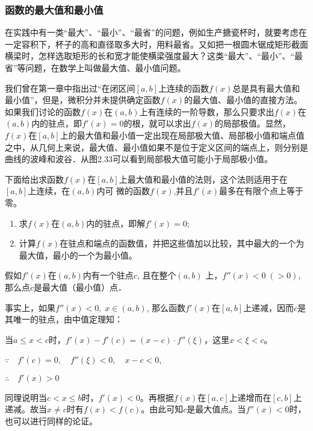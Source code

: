 \subsubsection{函数的最大值和最小值}
在实践中有一类“最大”、“最小”、“最省”的问题，例如生产搪瓷杯时，就要考虑在一定容积下，杯子的高和直径取多大时，用料最省。又如把一根圆木锯成矩形截面横梁时，怎样选取矩形的长和宽才能使横梁强度最大？这类“最大”、“最小”、“最省”等问题，在数学上叫做最大值、最小值问题。

我们曾在第一章中指出过“在闭区间$[a,b]$上连续的函数$f(x)$总是具有最大值和最小值”，但是，微积分并未提供确定函数$f(x)$的最大值、最小值的直接方法。如果我们讨论的函数$f(x)$在$(a,b)$上有连续的一阶导数，那么只要求出$f(x)$在$(a,b)$内的驻点，即$f'(x)=0$的根，就可以求出$f(x)$的局部极值。显然，$f(x)$在$[a,b]$上的最大值和最小值一定出现在局部极大值、局部极小值和端点值之中，从几何上来说，最大值、最小值如果不是位于定义区间的端点上，则分别是曲线的波峰和波谷．从图2.33可以看到局部极大值可能小于局部极小值。

\begin{figure}[htp]
    \centering
\begin{tikzpicture}[>=latex]
    
\end{tikzpicture}
    \caption{}
\end{figure}

下面给出求函数$f(x)$在$[a,b]$上最大值和最小值的法则，这个法则适用于在$[a,b]$上连续，在$(a,b)$内可
微的函数$f(x)$,并且$f'(x)$最多在有限个点上等于零。
\begin{enumerate}
    \item 求$f(x)$在$(a,b)$内的驻点，即解$f'(x)=0$;
    \item 计算$f(x)$在驻点和端点的函数值，并把这些值加以比较，其中最大的一个为最大值，最小的一个为最小值。
\end{enumerate}

假如$f'(x)$在$(a,b)$内有一个驻点$c$, 且在整个$(a,b)$
上，$f''(x)<0\; (>0)$, 那么点$c$是最大值（最小值）点．

事实上，如果$f''(x)<0,\; x\in (a,b)$, 那么函数$f'(x)$在$[a,b]$上递减，因而$c$是其唯一的驻点，由中值定理知：

当$a\le x<c$时，$f'(x)-f'(c)=(x-c)\cdot f''(\xi)$，这里$x<\xi<c$。

$\because\quad f' (c) =0,\quad f'' (\xi)<0,\quad x-c<0$,

$\therefore\quad f'(x)>0$

同理说明当$c<x\le b$时，$f'(x)<0$。再根据$f(x)$在$[a,c]$上递增而在$[c,b]$上递减。故当$x\ne c$时有$f(x)<f(c)$。由此可知$c$是最大值点。当$f''(x)<0$时，也可以进行同样的论证。

